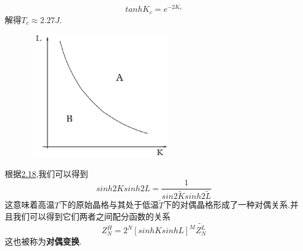 \documentclass[a4paper]{book}
\begin{document}
\begin{equation}
	tanhK_c=e^{-2K_c}
\end{equation}
解得$T_c\approx2.27J$.
 \begin{figure}[!h]
	\centering
	\includegraphics[width=6.5cm,height=5.5cm]{figures/4.eps}
	\caption{}
\end{figure}
根据\hyperref[2.18]{2.18},我们可以得到
\begin{equation}
		sinh2Ksinh2L=\frac{1}{sin2\tilde{K}sinh2\tilde{L}}
\end{equation}
这意味着高温$T$下的原始晶格与其处于低温$\tilde{T}$下的对偶晶格形成了一种对偶关系.并且我们可以得到它们两者之间配分函数的关系
\begin{equation}
Z^{H}_N=2^N[sinhKsinhL]^M\tilde{Z^L_N}	
\end{equation}
这也被称为\textbf{对偶变换}.
\end{document}

